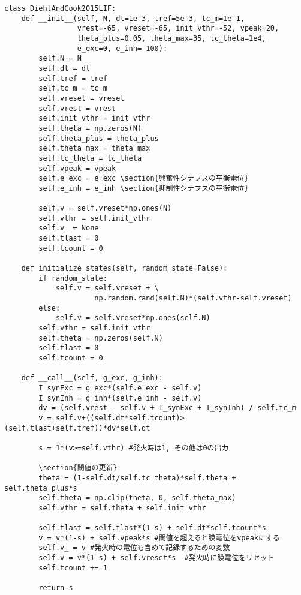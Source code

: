 \begin{verbatim}
class DiehlAndCook2015LIF:
    def __init__(self, N, dt=1e-3, tref=5e-3, tc_m=1e-1,
                 vrest=-65, vreset=-65, init_vthr=-52, vpeak=20,
                 theta_plus=0.05, theta_max=35, tc_theta=1e4,
                 e_exc=0, e_inh=-100):
        self.N = N
        self.dt = dt
        self.tref = tref
        self.tc_m = tc_m 
        self.vreset = vreset
        self.vrest = vrest
        self.init_vthr = init_vthr
        self.theta = np.zeros(N)
        self.theta_plus = theta_plus
        self.theta_max = theta_max
        self.tc_theta = tc_theta
        self.vpeak = vpeak
        self.e_exc = e_exc \section{興奮性シナプスの平衡電位}
        self.e_inh = e_inh \section{抑制性シナプスの平衡電位}
        
        self.v = self.vreset*np.ones(N)
        self.vthr = self.init_vthr
        self.v_ = None
        self.tlast = 0
        self.tcount = 0
    
    def initialize_states(self, random_state=False):
        if random_state:
            self.v = self.vreset + \ 
                     np.random.rand(self.N)*(self.vthr-self.vreset) 
        else:
            self.v = self.vreset*np.ones(self.N)
        self.vthr = self.init_vthr
        self.theta = np.zeros(self.N)
        self.tlast = 0
        self.tcount = 0
        
    def __call__(self, g_exc, g_inh):
        I_synExc = g_exc*(self.e_exc - self.v) 
        I_synInh = g_inh*(self.e_inh - self.v)
        dv = (self.vrest - self.v + I_synExc + I_synInh) / self.tc_m
        v = self.v+((self.dt*self.tcount)>(self.tlast+self.tref))*dv*self.dt
        
        s = 1*(v>=self.vthr) #発火時は1, その他は0の出力
        
        \section{閾値の更新}
        theta = (1-self.dt/self.tc_theta)*self.theta + self.theta_plus*s
        self.theta = np.clip(theta, 0, self.theta_max)
        self.vthr = self.theta + self.init_vthr
        
        self.tlast = self.tlast*(1-s) + self.dt*self.tcount*s
        v = v*(1-s) + self.vpeak*s #閾値を超えると膜電位をvpeakにする
        self.v_ = v #発火時の電位も含めて記録するための変数
        self.v = v*(1-s) + self.vreset*s  #発火時に膜電位をリセット
        self.tcount += 1
        
        return s 
\end{verbatim}
